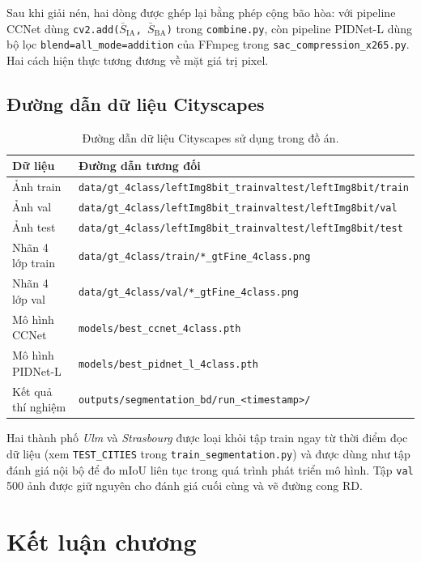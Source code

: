 Sau khi giải nén, hai dòng được ghép lại bằng phép cộng bão hòa: với pipeline CCNet dùng \texttt{cv2.add($\bar{S}_\mathrm{IA}$, $\bar{S}_\mathrm{BA}$)} trong \texttt{combine.py}, còn pipeline PIDNet-L dùng bộ lọc \texttt{blend=all\_mode=addition} của FFmpeg trong \texttt{sac\_compression\_x265.py}. Hai cách hiện thực tương đương về mặt giá trị pixel.

\subsection{Đường dẫn dữ liệu Cityscapes}

\begin{table}[H]
\centering
\caption{Đường dẫn dữ liệu Cityscapes sử dụng trong đồ án.}
\label{tab:cityscapes-paths}
\small
\begin{tabular}{l|l}
\hline
\textbf{Dữ liệu} & \textbf{Đường dẫn tương đối} \\
\hline
Ảnh train & \texttt{data/gt\_4class/leftImg8bit\_trainvaltest/leftImg8bit/train} \\
Ảnh val & \texttt{data/gt\_4class/leftImg8bit\_trainvaltest/leftImg8bit/val} \\
Ảnh test & \texttt{data/gt\_4class/leftImg8bit\_trainvaltest/leftImg8bit/test} \\
Nhãn 4 lớp train & \texttt{data/gt\_4class/train/*\_gtFine\_4class.png} \\
Nhãn 4 lớp val & \texttt{data/gt\_4class/val/*\_gtFine\_4class.png} \\
Mô hình CCNet & \texttt{models/best\_ccnet\_4class.pth} \\
Mô hình PIDNet-L & \texttt{models/best\_pidnet\_l\_4class.pth} \\
Kết quả thí nghiệm & \texttt{outputs/segmentation\_bd/run\_<timestamp>/} \\
\hline
\end{tabular}
\end{table}

Hai thành phố \textit{Ulm} và \textit{Strasbourg} được loại khỏi tập train ngay từ thời điểm đọc dữ liệu (xem \texttt{TEST\_CITIES} trong \texttt{train\_segmentation.py}) và được dùng như tập đánh giá nội bộ để đo mIoU liên tục trong quá trình phát triển mô hình. Tập \texttt{val} 500 ảnh được giữ nguyên cho đánh giá cuối cùng và vẽ đường cong RD.

\section{Kết luận chương}
\label{sec:ket-luan-c3}
 
